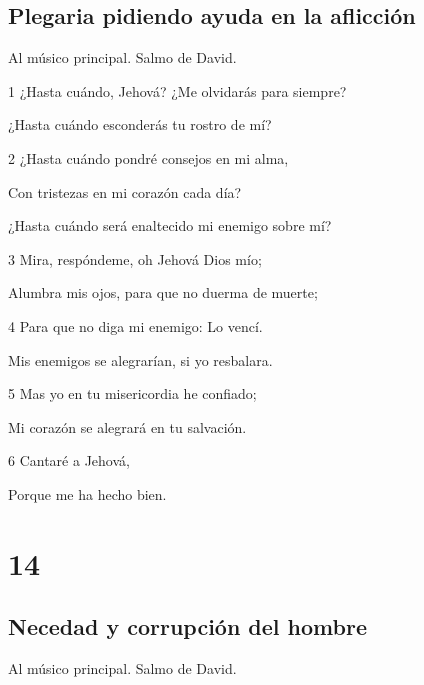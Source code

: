 \section*{Plegaria pidiendo ayuda en la aflicción}

\par Al músico principal. Salmo de David.

\par 1 ¿Hasta cuándo, Jehová? ¿Me olvidarás para siempre?
\par ¿Hasta cuándo esconderás tu rostro de mí?
\par 2 ¿Hasta cuándo pondré consejos en mi alma,
\par Con tristezas en mi corazón cada día?
\par ¿Hasta cuándo será enaltecido mi enemigo sobre mí?
\par 3 Mira, respóndeme, oh Jehová Dios mío;
\par Alumbra mis ojos, para que no duerma de muerte;
\par 4 Para que no diga mi enemigo: Lo vencí.
\par Mis enemigos se alegrarían, si yo resbalara.
\par 5 Mas yo en tu misericordia he confiado;
\par Mi corazón se alegrará en tu salvación.
\par 6 Cantaré a Jehová,
\par Porque me ha hecho bien.

\chapter{14}

\section*{Necedad y corrupción del hombre}

\par Al músico principal. Salmo de David.


